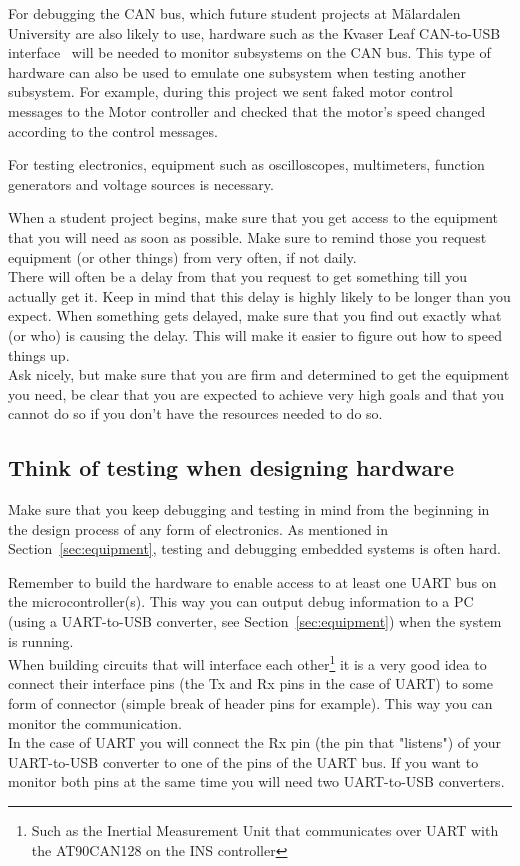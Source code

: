 For debugging the CAN bus, which future student projects at M\"{a}lardalen University are also likely to use, hardware such as the Kvaser Leaf CAN-to-USB interface~\cite{web:kvaser_can} will be needed to monitor subsystems on the CAN bus. This type of hardware can also be used to emulate one subsystem when testing another subsystem. For example, during this project we sent faked motor control messages to the Motor controller and checked that the motor's speed changed according to the control messages.

For testing electronics, equipment such as oscilloscopes, multimeters, function generators and voltage sources is necessary.

When a student project begins, make sure that you get access to the equipment that you will need as soon as possible.  Make sure to remind those you request equipment (or other things) from very often, if not daily. \\
There will often be a delay from that you request to get something till you actually get it. Keep in mind that this delay is highly likely to be longer than you expect. When something gets delayed, make sure that you find out exactly what (or who) is causing the delay. This will make it easier to figure out how to speed things up. \\
Ask nicely, but make sure that you are firm and determined to get the equipment you need, be clear that you are expected to achieve very high goals and that you cannot do so if you don't have the resources needed to do so.


\subsection{Think of testing when designing hardware}\label{sec:testing}
Make sure that you keep debugging and testing in mind from the beginning in the design process of any form of electronics. As mentioned in Section~\ref{sec:equipment}, testing and debugging embedded systems is often hard. 

Remember to build the hardware to enable access to at least one UART bus on the microcontroller(s). This way you can output debug information to a PC (using a UART-to-USB converter, see Section~\ref{sec:equipment}) when the system is running. \\
When building circuits that will interface each other\footnote{Such as the Inertial Measurement Unit that communicates over UART with the AT90CAN128 on the INS controller} it is a very good idea to connect their interface pins (the Tx and Rx pins in the case of UART) to some form of connector (simple break of header pins for example). This way you can monitor the communication. \\
In the case of UART you will connect the Rx pin (the pin that "listens") of your UART-to-USB converter to one of the pins of the UART bus. If you want to monitor both pins at the same time you will need two UART-to-USB converters.

